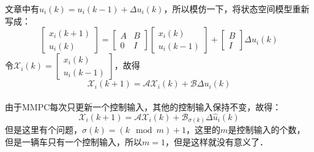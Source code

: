 文章中有$u_{i}(k)=u_{i}(k-1)+\Delta u_{i}(k)$，所以模仿一下，将状态空间模型重新写成：
\begin{equation}
  \begin{bmatrix}
x_{i}(k+1) \\
u_{i}(k)
\end{bmatrix}=\begin{bmatrix}
A  &B\\
 0 &I
\end{bmatrix}\begin{bmatrix}
x_{i}(k) \\
u_{i}(k-1)
\end{bmatrix}+\begin{bmatrix}
B \\
I
\end{bmatrix}\Delta u_{i}(k)
\end{equation}
令$\mathcal{X} _{i}(k)=\begin{bmatrix}
x_{i}(k) \\
u_{i}(k-1)
\end{bmatrix}$，故得
\begin{equation}
\mathcal{X} _{i}(k+1)=\mathcal{A} \mathcal{X}_{i}(k)+\mathcal{B}\Delta u_{i}(k)\end{equation}\\
由于MMPC每次只更新一个控制输入，其他的控制输入保持不变，故得：
\begin{equation}
\mathcal{X} _{i}(k+1)=\mathcal{A} \mathcal{X}_{i}(k)+\mathcal{B}_{\sigma (k)}\Delta \hat{u} _{i}(k)
\end{equation}
但是这里有个问题，$\sigma(k)=(k\mod{m})+1$，这里的$m$是控制输入的个数，但是一辆车只有一个控制输入，所以$m=1$，但是这样就没有意义了．






